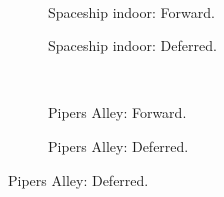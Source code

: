 \begin{figure}[t]
\begin{subfigure}[b]{\textwidth}
  \end{subfigure}\hfill\\
  \begin{adjustbox}{minipage=\textwidth, scale=0.55}
    \begin{subfigure}[b]{0.8\textwidth}
      \centering
      \def\svgwidth{\textwidth}
      
      \caption{Spaceship indoor: Forward.}
      \label{fig:ts-lights-forward:indoor}
    \end{subfigure}
  \end{adjustbox}\hspace{-0.075\textwidth} %
  \begin{adjustbox}{minipage=\textwidth, scale=0.55}
    \begin{subfigure}[b]{0.8\textwidth}
      \centering
      \def\svgwidth{\textwidth}
      
      \caption{Spaceship indoor: Deferred.}
      \label{fig:ts-lights-deferred:indoor}
    \end{subfigure}
  \end{adjustbox} \\
  \begin{adjustbox}{minipage=\textwidth, scale=0.55}
    \begin{subfigure}[b]{0.8\textwidth}
      \centering
      \def\svgwidth{\textwidth}
      
      \caption{Pipers Alley: Forward.}
      \label{fig:ts-lights-forward:alley}
    \end{subfigure}
  \end{adjustbox}\hspace{-0.075\textwidth} %
  \begin{adjustbox}{minipage=\textwidth, scale=0.55}
    \begin{subfigure}[b]{0.8\textwidth}
      \centering
      \def\svgwidth{\textwidth}
      
      \caption{Pipers Alley: Deferred.}
      \label{fig:ts-lights-deferred:alley}
    \end{subfigure}

\end{adjustbox}
\end{figure}
